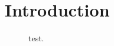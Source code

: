\chapter{Introduction}

\begin{figure}[H]
\centering
{}

\caption{test.}
\label{fig:test}
\end{figure}